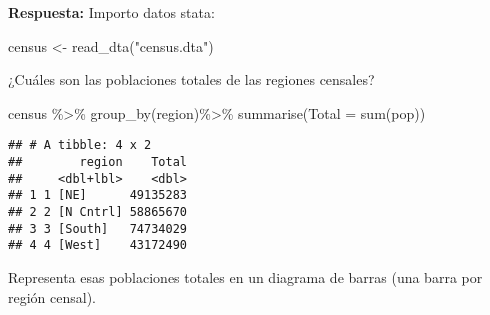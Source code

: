 \documentclass[
]{article}
\newenvironment{Shaded}{\begin{snugshade}}{\end{snugshade}}
\newcommand{\AttributeTok}[1]{\textcolor[rgb]{0.77,0.63,0.00}{#1}}
\newcommand{\CommentTok}[1]{\textcolor[rgb]{0.56,0.35,0.01}{\textit{#1}}}
\newcommand{\FunctionTok}[1]{\textcolor[rgb]{0.00,0.00,0.00}{#1}}
\newcommand{\NormalTok}[1]{#1}
\newcommand{\OtherTok}[1]{\textcolor[rgb]{0.56,0.35,0.01}{#1}}
\newcommand{\SpecialCharTok}[1]{\textcolor[rgb]{0.00,0.00,0.00}{#1}}
\newcommand{\StringTok}[1]{\textcolor[rgb]{0.31,0.60,0.02}{#1}}
\begin{document}
\textbf{Respuesta:} Importo datos stata:

\begin{Shaded}
\begin{Highlighting}[]
\NormalTok{census }\OtherTok{\textless{}{-}} \FunctionTok{read\_dta}\NormalTok{(}\StringTok{"census.dta"}\NormalTok{)}
\end{Highlighting}
\end{Shaded}

¿Cuáles son las poblaciones totales de las regiones censales?

\begin{Shaded}
\begin{Highlighting}[]
\NormalTok{census }\SpecialCharTok{\%\textgreater{}\%} 
    \FunctionTok{group\_by}\NormalTok{(region)}\SpecialCharTok{\%\textgreater{}\%} 
  \FunctionTok{summarise}\NormalTok{(}\AttributeTok{Total =} \FunctionTok{sum}\NormalTok{(pop))}
\end{Highlighting}
\end{Shaded}

\begin{verbatim}
## # A tibble: 4 x 2
##        region    Total
##     <dbl+lbl>    <dbl>
## 1 1 [NE]      49135283
## 2 2 [N Cntrl] 58865670
## 3 3 [South]   74734029
## 4 4 [West]    43172490
\end{verbatim}

Representa esas poblaciones totales en un diagrama de barras (una barra
por región censal).

\begin{Shaded}
\end{Shaded}
\end{document}
